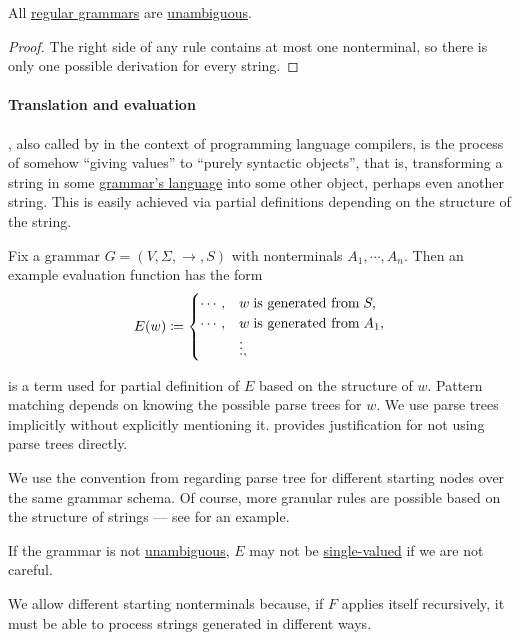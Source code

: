 \begin{proposition}\label{thm:regular_grammars_are_unambiguous}
  All \hyperref[def:chomsky_hierarchy/regular]{regular grammars} are \hyperref[def:grammar_ambiguity]{unambiguous}.
\end{proposition}
\begin{proof}
  The right side of any rule contains at most one nonterminal, so there is only one possible derivation for every string.
\end{proof}

\paragraph{Translation and evaluation}

\begin{concept}\label{con:evaluation}
  , also called  by  in the context of programming language compilers, is the process of somehow \enquote{giving values} to \enquote{purely syntactic objects}, that is, transforming a string in some \hyperref[def:formal_grammar/language]{grammar's language} into some other object, perhaps even another string. This is easily achieved via partial definitions depending on the structure of the string.

  Fix a grammar \( G = (V, \Sigma, \to, S) \) with nonterminals \( A_1, \cdots, A_n \). Then an example evaluation function has the form
  \begin{equation*}
    E(w) \coloneqq \begin{cases}
      \cdots, &w \T{is generated from} S, \\
      \cdots, &w \T{is generated from} A_1, \\
              &\vdots,
    \end{cases}
  \end{equation*}

   is a term used for partial definition of \( E \) based on the structure of \( w \). Pattern matching depends on knowing the possible parse trees for \( w \). We use parse trees implicitly without explicitly mentioning it.  provides justification for not using parse trees directly.

  We use the convention from  regarding parse tree for different starting nodes over the same grammar schema. Of course, more granular rules are possible based on the structure of strings --- see  for an example.
\end{concept}
\begin{comments}
  \item If the grammar is not \hyperref[def:grammar_ambiguity]{unambiguous}, \( E \) may not be \hyperref[def:function]{single-valued} if we are not careful.
  \item We allow different starting nonterminals because, if \( F \) applies itself recursively, it must be able to process strings generated in different ways.
\end{comments}

